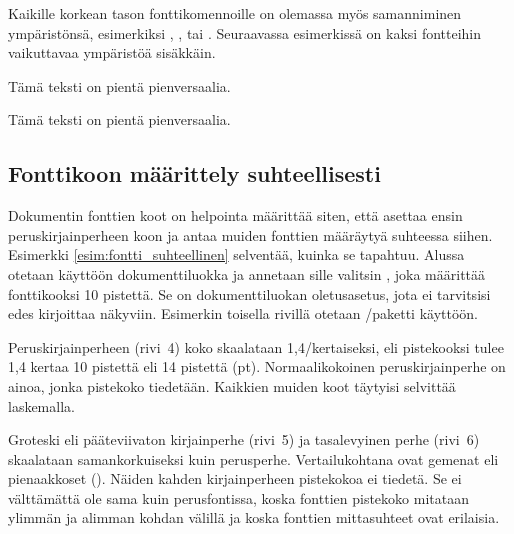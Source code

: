 Kaikille korkean tason fonttikomennoille on olemassa myös samanniminen
ympäristönsä, esimerkiksi , ,
 tai . Seuraavassa esimerkissä on
kaksi fontteihin vaikuttavaa ympäristöä sisäkkäin.

\begin{koodilohkosis}
\begin{footnotesize}
  \begin{scshape}
    Tämä teksti on pientä pienversaalia.
  \end{scshape}
\end{footnotesize}
\end{koodilohkosis}

\begin{tulossis}
  \begin{footnotesize}
    \begin{scshape}
      Tämä teksti on pientä pienversaalia.
    \end{scshape}
  \end{footnotesize}
\end{tulossis}

\subsection{Fonttikoon määrittely suhteellisesti}
\label{luku:fontti_suhteellinen}

Dokumentin fonttien koot on helpointa määrittää siten, että asettaa
ensin peruskirjainperheen koon ja antaa muiden fonttien määräytyä
suhteessa siihen. Esimerkki \ref{esim:fontti_suhteellinen} selventää,
kuinka se tapahtuu. Alussa otetaan käyttöön dokumenttiluokka
 ja annetaan sille valitsin \koodi{10pt}, joka määrittää
fonttikooksi 10 pistettä. Se on dokumenttiluokan oletusasetus, jota ei
tarvitsisi edes kirjoittaa näkyviin. Esimerkin toisella rivillä otetaan
\-/paketti käyttöön.

Peruskirjainperheen (rivi~4) koko skaalataan 1,4\-/kertaiseksi, eli
pistekooksi tulee 1,4 kertaa 10 pistettä eli 14 pistettä (pt).
Normaalikokoinen peruskirjainperhe on ainoa, jonka pistekoko tiedetään.
Kaikkien muiden koot täytyisi selvittää laskemalla.

Groteski eli pääteviivaton kirjainperhe (rivi~5) ja tasalevyinen perhe
(rivi~6) skaalataan samankorkuiseksi kuin perusperhe. Vertailukohtana
ovat gemenat eli pienaakkoset (). Näiden kahden
kirjainperheen pistekokoa ei tiedetä. Se ei välttämättä ole sama kuin
perusfontissa, koska fonttien pistekoko mitataan ylimmän ja alimman
kohdan välillä ja koska fonttien mittasuhteet ovat erilaisia.

